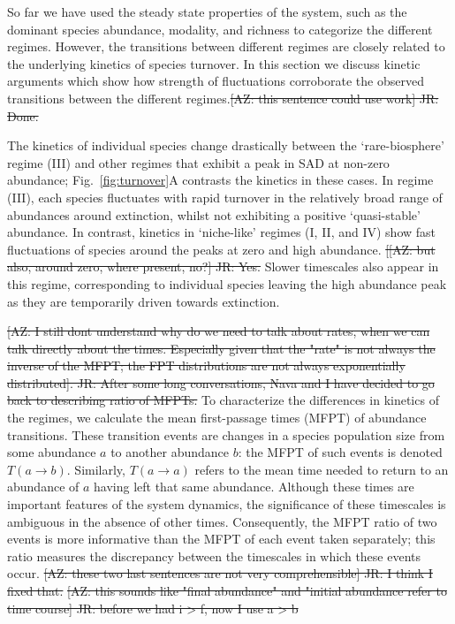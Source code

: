 \documentclass[9pt,twocolumn,twoside,lineno]{pnas-new}
\begin{document}
So far we have used the steady state properties of the system, such as the dominant species abundance, modality, and richness to categorize the different regimes. 
However, the transitions between different regimes are closely related to the underlying kinetics of species turnover.
In this section we discuss kinetic arguments which show how strength of fluctuations corroborate the observed transitions between the different regimes.\st{[AZ: this sentence could use work] JR: Done.}

The kinetics of individual species change drastically between the `rare-biosphere' regime (III) and other regimes that exhibit a peak in SAD at non-zero abundance; Fig.~\ref{fig:turnover}A contrasts the kinetics in these cases. 
In regime (III), each species fluctuates with rapid turnover in the relatively broad range of abundances around extinction,  whilst not exhibiting a positive `quasi-stable' abundance.  
In contrast, kinetics in `niche-like' regimes (I, II, and IV) show fast fluctuations of species around the peaks at zero and high abundance. \st{[[AZ: but also, around zero, where present, no?] JR: Yes.}
Slower timescales also appear in this regime, corresponding to individual species leaving the high abundance peak as they are temporarily driven towards extinction.

\st{[AZ: I still dont understand why do we need to talk about rates, when we can talk directly about the times. Especially given that the "rate" is not always the inverse of the MFPT; the FPT distributions are not always exponentially distributed]. JR: After some long conversations, Nava and I have decided to go back to describing ratio of MFPTs.}
To characterize the differences in kinetics of the regimes, we calculate the mean first-passage times (MFPT) of abundance transitions.
These transition events are changes in a species population size from some abundance $a$ to another abundance $b$: the MFPT of such events is denoted $T(a \rightarrow b)$.
Similarly, $T(a\rightarrow a)$ refers to the mean time needed to return to an abundance of $a$ having left that same abundance.
Although these times are important features of the system dynamics, the significance of these timescales is ambiguous in the absence of other times.
Consequently, the MFPT ratio of two events is more informative than the MFPT of each event taken separately; this ratio measures the discrepancy between the timescales in which these events occur. \st{[AZ: these two last sentences are not very comprehensible] JR: I think I fixed that.}
\st{[AZ: this sounds like "final abundance" and "initial abundance refer to time course] JR: before we had i > f, now I use a > b}
\end{document}
